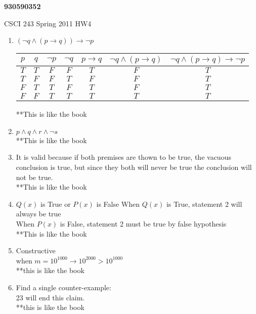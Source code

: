\documentclass{article}
\begin{document}
\begin{center}
{\bf 930590352}
	
CSCI 243 Spring 2011 HW4
\end{center}
\begin{enumerate}
  \item $(\neg q \land (p \rightarrow q)) \rightarrow \neg p$
    	\begin{center}
	\begin{tabular}{ | c | c | c | c | c | c | c |}
	  \hline
	  $p$ & $q$ & $\neg p$ & $\neg q$ & $p \rightarrow q$ & $\neg q \land (p \rightarrow q)$ & $\neg q \land (p \rightarrow q) \rightarrow \neg p$  \\ \hline
	$T$ & $T$ & $F$ & $F$ & $T$ & $F$ & $T$ \\
	$T$ & $F$ & $F$ & $T$ & $F$ & $F$ & $T$ \\
	$F$ & $T$ & $T$ & $F$ & $T$ & $F$ & $T$ \\
	$F$ & $F$ & $T$ & $T$ & $T$ & $T$ & $T$ \\ \hline
	\end{tabular}
	\end{center}
	**This is like the book

  \item $p \land q \land r \land \neg s$ \\
	**This is like the book

  \item It is valid because if both premises are thown to be true, the vacuous conclusion is true, but since they both will never be true the conclusion will not be true.\\
**This is like the book

  \item $Q(x)$ is True or $P(x)$ is False
	When $Q(x)$ is True, statement 2 will always be true \\
	When $P(x)$ is False, statement 2 must be true by false hypothesis \\
	**This is like the book

  \item Constructive \\
	when $m = 10^{1000} \rightarrow 10^{2000} > 10^{1000}$ \\
	**this is like the book

  \item Find a single counter-example: \\
	23 will end this claim. \\
	**this is like the book


\end{enumerate}
\end{document}
